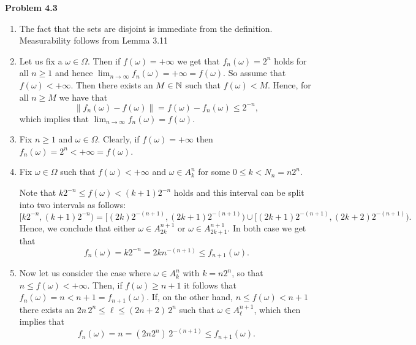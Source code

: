 \documentclass{lecturenotes}
\begin{document}
\textbf{Problem 4.3}

\begin{enumerate}[label={(\alph*)}]
\item The fact that the sets are disjoint is immediate from the definition. Measurability follows from Lemma 3.11
\item Let us fix a $\omega \in \Omega$. Then if $f(\omega) = +\infty$ we get that $f_n(\omega) = 2^n$ holds for all $n \ge 1$ and hence $\lim_{n \to \infty} f_n(\omega) = +\infty = f(\omega)$. So assume that $f(\omega) < +\infty$. Then there exists an $M \in \mathbb N$ such that $f(\omega) < M$. Hence, for all $n \ge M$ we have that 
\[
	\|f_n(\omega) - f(\omega)\| = f(\omega) - f_n(\omega) \le 2^{-n},
\]
which implies that $\lim_{n \to \infty} f_n(\omega) = f(\omega)$.
\item Fix $n \ge 1$ and $\omega \in \Omega$. Clearly, if $f(\omega) = +\infty$ then $f_n(\omega) = 2^n < +\infty = f(\omega)$. 

\item Fix $\omega \in \Omega$ such that $f(\omega) < +\infty$ and $\omega \in A_k^n$ for some $0 \le k < N_n = n 2^n$. 

Note that $k 2^{-n} \le f(\omega) < (k+1) 2^{-n}$ holds and this interval can be split into two intervals as follows:
\[
	[k 2^{-n}, (k+1) 2^{-n}) = [(2k) 2^{-(n+1)}, (2k +1)2^{-(n+1)}) \cup [(2k +1)2^{-(n+1)}, (2k + 2)2^{-(n+1)}).
\] 
Hence, we conclude that either $\omega \in A_{2k}^{n+1}$ or $\omega \in A_{2k+1}^{n+1}$. In both case we get that 
\[
	f_n(\omega) = k2^{-n} = 2k n^{-(n+1)} \le f_{n+1}(\omega).
\]

\item Now let us consider the case where $\omega \in A_k^n$ with $k = n 2^n$, so that $n \le f(\omega) < +\infty$. Then, if $f(\omega) \ge n + 1$ it follows that $f_n(\omega) = n < n + 1 = f_{n+1}(\omega)$. If, on the other hand, $n \le f(\omega) < n + 1$ there exists an $2n \, 2^n \le \ell \le (2n+2) \, 2^n$ such that $\omega \in A_\ell^{n+1}$, which then implies that 
\[
	f_n(\omega) = n = (2n 2^{n}) \, 2^{-(n+1)} \le f_{n+1}(\omega).
\]
\end{enumerate}

\bigskip
\end{document}
